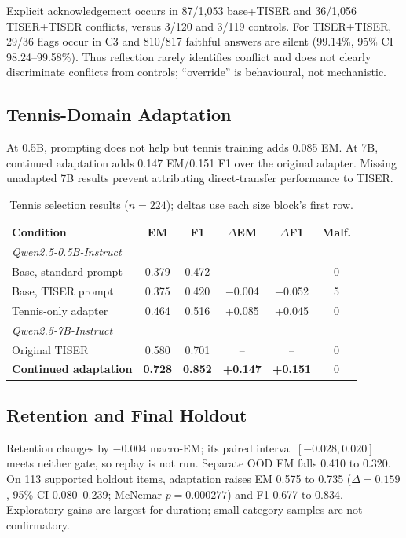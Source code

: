 \documentclass[conference]{IEEEtran}
\begin{document}
Explicit acknowledgement occurs in 87/1,053 base+TISER and 36/1,056 TISER+TISER conflicts, versus 3/120 and 3/119 controls. For TISER+TISER, 29/36 flags occur in C3 and 810/817 faithful answers are silent (99.14\%, 95\% CI 98.24--99.58\%). Thus reflection rarely identifies conflict and does not clearly discriminate conflicts from controls; ``override'' is behavioural, not mechanistic.

\subsection{Tennis-Domain Adaptation}

At 0.5B, prompting does not help but tennis training adds 0.085 EM. At 7B, continued adaptation adds 0.147 EM/0.151 F1 over the original adapter. Missing unadapted 7B results prevent attributing direct-transfer performance to TISER.

\begin{table}[t]
\centering
\caption{Tennis selection results ($n=224$); deltas use each size block's first row.}
\label{tab:tennis}
\setlength{\tabcolsep}{3.4pt}
{\footnotesize
\begin{tabular}{lccccc}
\toprule
\textbf{Condition} & \textbf{EM} & \textbf{F1} & \textbf{$\Delta$EM} & \textbf{$\Delta$F1} & \textbf{Malf.} \\
\midrule
\multicolumn{6}{l}{\emph{Qwen2.5-0.5B-Instruct}} \\
Base, standard prompt   & 0.379 & 0.472 & -- & -- & 0 \\
Base, TISER prompt      & 0.375 & 0.420 & $-$0.004 & $-$0.052 & 5 \\
\rowcolor{gray!10}
Tennis-only adapter     & 0.464 & 0.516 & +0.085 & +0.045 & 0 \\
\midrule
\multicolumn{6}{l}{\emph{Qwen2.5-7B-Instruct}} \\
Original TISER & 0.580 & 0.701 & -- & -- & 0 \\
\rowcolor{gray!18}
\textbf{Continued adaptation} & \textbf{0.728} & \textbf{0.852} & \textbf{+0.147} & \textbf{+0.151} & 0 \\
\bottomrule
\end{tabular}
}
\end{table}

\subsection{Retention and Final Holdout}

Retention changes by $-0.004$ macro-EM; its paired interval $[-0.028,0.020]$ meets neither gate, so replay is not run. Separate OOD EM falls 0.410 to 0.320. On 113 supported holdout items, adaptation raises EM 0.575 to 0.735 ($\Delta=0.159$, 95\% CI 0.080--0.239; McNemar $p=0.000277$) and F1 0.677 to 0.834. Exploratory gains are largest for duration; small category samples are not confirmatory.
\end{document}
